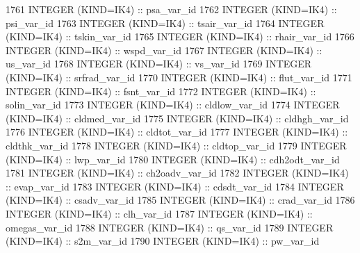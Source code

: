 \begin{DoxyCode}
1761     \textcolor{keywordtype}{INTEGER (KIND=IK4)}                  :: psa\_var\_id
1762     \textcolor{keywordtype}{INTEGER (KIND=IK4)}                  :: psi\_var\_id
1763     \textcolor{keywordtype}{INTEGER (KIND=IK4)}                  :: tsair\_var\_id
1764     \textcolor{keywordtype}{INTEGER (KIND=IK4)}                  :: tskin\_var\_id
1765     \textcolor{keywordtype}{INTEGER (KIND=IK4)}                  :: rhair\_var\_id
1766     \textcolor{keywordtype}{INTEGER (KIND=IK4)}                  :: wspd\_var\_id
1767     \textcolor{keywordtype}{INTEGER (KIND=IK4)}                  :: us\_var\_id
1768     \textcolor{keywordtype}{INTEGER (KIND=IK4)}                  :: vs\_var\_id
1769     \textcolor{keywordtype}{INTEGER (KIND=IK4)}                  :: srfrad\_var\_id
1770     \textcolor{keywordtype}{INTEGER (KIND=IK4)}                  :: flut\_var\_id
1771     \textcolor{keywordtype}{INTEGER (KIND=IK4)}                  :: fsnt\_var\_id
1772     \textcolor{keywordtype}{INTEGER (KIND=IK4)}                  :: solin\_var\_id
1773     \textcolor{keywordtype}{INTEGER (KIND=IK4)}                  :: cldlow\_var\_id
1774     \textcolor{keywordtype}{INTEGER (KIND=IK4)}                  :: cldmed\_var\_id
1775     \textcolor{keywordtype}{INTEGER (KIND=IK4)}                  :: cldhgh\_var\_id
1776     \textcolor{keywordtype}{INTEGER (KIND=IK4)}                  :: cldtot\_var\_id
1777     \textcolor{keywordtype}{INTEGER (KIND=IK4)}                  :: cldthk\_var\_id
1778     \textcolor{keywordtype}{INTEGER (KIND=IK4)}                  :: cldtop\_var\_id
1779     \textcolor{keywordtype}{INTEGER (KIND=IK4)}                  :: lwp\_var\_id
1780     \textcolor{keywordtype}{INTEGER (KIND=IK4)}                  :: cdh2odt\_var\_id
1781     \textcolor{keywordtype}{INTEGER (KIND=IK4)}                  :: ch2oadv\_var\_id
1782     \textcolor{keywordtype}{INTEGER (KIND=IK4)}                  :: evap\_var\_id
1783     \textcolor{keywordtype}{INTEGER (KIND=IK4)}                  :: cdsdt\_var\_id
1784     \textcolor{keywordtype}{INTEGER (KIND=IK4)}                  :: csadv\_var\_id
1785     \textcolor{keywordtype}{INTEGER (KIND=IK4)}                  :: crad\_var\_id
1786     \textcolor{keywordtype}{INTEGER (KIND=IK4)}                  :: clh\_var\_id
1787     \textcolor{keywordtype}{INTEGER (KIND=IK4)}                  :: omegas\_var\_id
1788     \textcolor{keywordtype}{INTEGER (KIND=IK4)}                  :: qs\_var\_id
1789     \textcolor{keywordtype}{INTEGER (KIND=IK4)}                  :: s2m\_var\_id
1790     \textcolor{keywordtype}{INTEGER (KIND=IK4)}                  :: pw\_var\_id

\end{DoxyCode}
